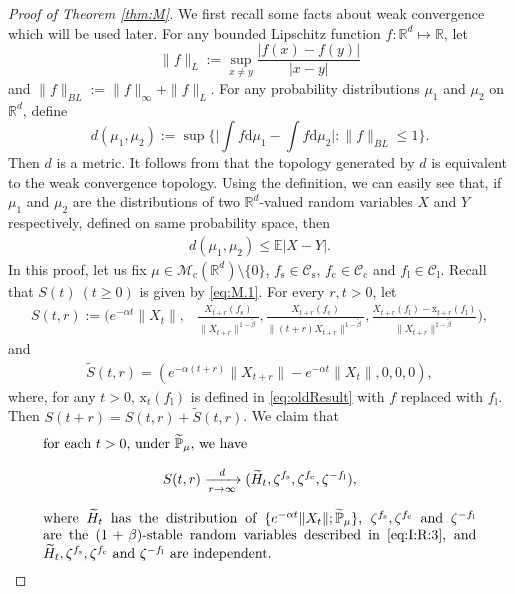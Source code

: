 \documentclass[12pt,a4paper]{amsart}
\theoremstyle{plain}
\theoremstyle{definition}
\numberwithin{equation}{section}
\begin{document}
\begin{proof}[Proof of Theorem \ref{thm:M}]
 	We first recall some facts about weak convergence which will be used later.
	For any bounded Lipschitz function $f:\mathbb R^d\mapsto \mathbb R$, let
\[
	\|f\|_L
	:=\sup_{x\neq y}\frac{|f(x)-f(y)|}{|x-y|}
\]
	and $\|f\|_{BL}:= \|f\|_{\infty}+\|f\|_L.$
	For any probability distributions $\mu_1$ and $\mu_2$ on $\mathbb R^d$, define
\[
	d(\mu_1,\mu_2)
  	:=\sup\Big\{\Big|\int f \mathrm d\mu_1-\int f \mathrm d\mu_2\Big|:\|f\|_{BL}\leq 1\Big\}.
\]
	Then $d$ is a metric. It follows from \cite[Theorem 11.3.3]{Dudley2002} that the topology generated by $d$ is equivalent to the weak convergence topology.
	Using the definition, we can easily see that, if $\mu_1$ and $\mu_2$ are the distributions of two $\mathbb R^d $-valued random variables $X$ and $Y$ respectively, defined on same probability space, then
\begin{align}
\label{ineq: distribution control}
  	d(\mu_1,\mu_2)
  	\leq \mathbb E|X-Y|.
\end{align}
	In this proof, let us fix $\mu\in \mathcal M_\mathrm c(\mathbb R^d)\setminus \{0\}$, $f_\mathrm s\in \mathcal C_\mathrm s$, $f_\mathrm c \in \mathcal C_\mathrm c$ and $f_\mathrm l \in \mathcal C_\mathrm l$.
	Recall that $S(t)~(t\geq 0)$ is given by \eqref{eq:M.1}.
	For every $r,t> 0$, let
\begin{align}
	S(t,r)
	:=\Big(e^{-\alpha t}\|X_t\|,& \frac{X_{t+r}(f_\mathrm s)}{\|X_{t+r}\|^{1-\tilde{\beta}}}, \frac{X_{t+r}(f_\mathrm c)}{\|(t+r)X_{t+r}\|^{1-\tilde{\beta}}}, \frac{X_{t+r}(f_\mathrm l)-\mathrm x_{t+r}(f_\mathrm l) }{\|X_{t+r}\|^{1-\tilde{\beta}}}\Big),
\end{align}
	and
\begin{align}
	\widetilde{S}(t,r)
	= (e^{-\alpha (t+r)}\|X_{t+r}\|-e^{-\alpha t}\|X_t\|,0,0,0),
\end{align}
	where, for any $t>0$, $\mathrm x_t(f_\mathrm l)$ is defined in \eqref{eq:oldResult} with $f$ replaced with $f_\mathrm l$.
	Then $S(t+r)=S(t,r)+\widetilde{S}(t,r)$.
	We claim that
\begin{equation}
\label{eq:M.3}
\begin{minipage}{0.9\textwidth}
	for each $t> 0$, under $\widetilde{\mathbb P}_{\mu}$, we have
\[
	S(t,r)
	\xrightarrow[r\rightarrow \infty]{d} (\widetilde H_t,\zeta^{f_\mathrm s},\zeta^{f_\mathrm c},\zeta^{-f_\mathrm l}),
\]
	where $\widetilde H_t$ has the distribution of $\{e^{-\alpha t} \|X_t\|; \widetilde {\mathbb P}_\mu\}$, $\zeta^{f_\mathrm s},\zeta^{f_\mathrm c}$ and $\zeta^{-f_\mathrm l}$ are the $(1+\beta)$-stable random variables described in \eqref{eq:I:R:3}, 	and $\widetilde H_t,\zeta^{f_\mathrm s},\zeta^{f_\mathrm c}$ and $\zeta^{-f_\mathrm l}$ are independent.
\end{minipage}
\end{equation}


\end{proof}
\end{document}
